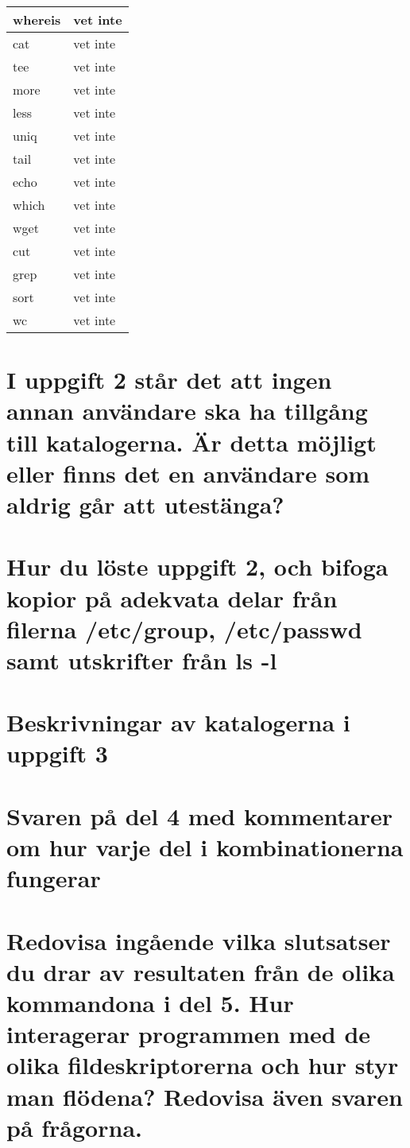 \documentclass[11pt]{article}
\begin{document}
\begin{center}
\begin{longtable}{ | l | p{10cm} |}
	whereis & vet inte \\ \hline	
	cat & vet inte \\ \hline	
	tee & vet inte \\ \hline	
	more & vet inte \\ \hline	
	less & vet inte \\ \hline	
	uniq & vet inte \\ \hline	
	tail & vet inte \\ \hline	
	echo & vet inte \\ \hline	
	which & vet inte \\ \hline	
	wget & vet inte \\ \hline	
	cut & vet inte \\ \hline	
	grep & vet inte \\ \hline	
	sort & vet inte \\ \hline	
	wc & vet inte \\ \hline	    
    \end{longtable}
\end{center}

\section{I uppgift 2 står det att ingen annan användare ska ha tillgång till katalogerna. Är detta möjligt eller finns det en användare som aldrig går att utestänga?}
\lipsum[56]

\section{Hur du löste uppgift 2, och bifoga kopior på adekvata delar från filerna /etc/group, /etc/passwd samt utskrifter från ls -l}
\lipsum[56]
     
\section{Beskrivningar av katalogerna i uppgift 3}
\lipsum[56]

\section{Svaren på del 4 med kommentarer om hur varje del i kombinationerna fungerar}
\lipsum[56]

\section{Redovisa ingående vilka slutsatser du drar av resultaten från de olika kommandona i del 5. Hur interagerar programmen med de olika fildeskriptorerna och hur styr man flödena? Redovisa även svaren på frågorna.}
\lipsum[56]
\end{document}
